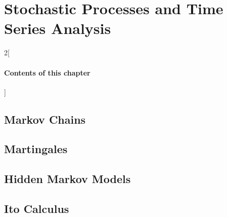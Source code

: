 \chapter{Stochastic Processes and Time Series Analysis}

\begin{multicols}{2}[\subsubsection*{Contents of this chapter}]
\end{multicols}


\section{Markov Chains}

\section{Martingales}

\section{Hidden Markov Models}

\section{Ito Calculus}